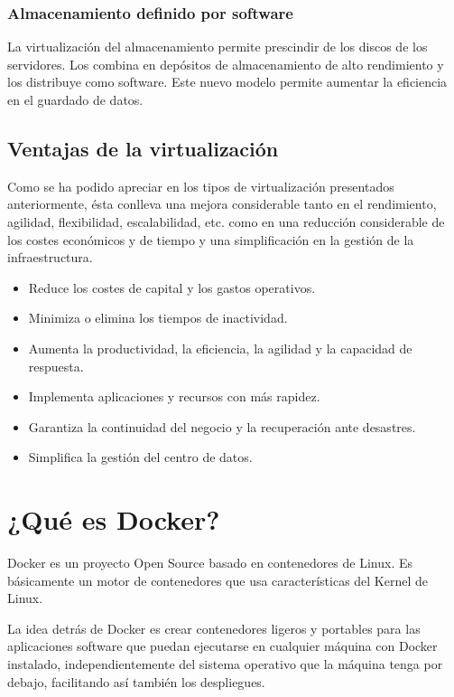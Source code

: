 \subsubsection{Almacenamiento definido por software}

La virtualización del almacenamiento permite prescindir de los discos de los servidores. Los combina en depósitos de almacenamiento de alto rendimiento y los distribuye como software. Este nuevo modelo permite aumentar la eficiencia en el guardado de datos.
\pagebreak  

\subsection{Ventajas de la virtualización}

Como se ha podido apreciar en los tipos de virtualización presentados anteriormente, ésta conlleva una mejora considerable tanto en el rendimiento, agilidad, flexibilidad, escalabilidad, etc. como en una reducción considerable de los costes económicos y de tiempo y una simplificación en la gestión de la infraestructura.

\begin{itemize}
\item Reduce los costes de capital y los gastos operativos.
\item Minimiza o elimina los tiempos de inactividad.
\item Aumenta la productividad, la eficiencia, la agilidad y la capacidad de respuesta.
\item Implementa aplicaciones y recursos con más rapidez.
\item Garantiza la continuidad del negocio y la recuperación ante desastres.
\item Simplifica la gestión del centro de datos. 
\end{itemize}

\section{¿Qué es Docker?}

Docker es un proyecto Open Source basado en contenedores de Linux. Es básicamente un motor de contenedores que usa características del Kernel de Linux.

La idea detrás de Docker es crear contenedores ligeros y portables para las aplicaciones software que puedan ejecutarse en cualquier máquina con Docker instalado,
independientemente del sistema operativo que la máquina tenga por debajo, facilitando así también los despliegues.

